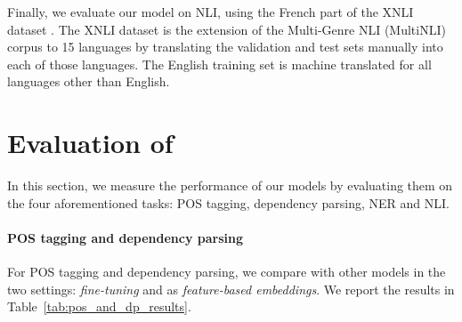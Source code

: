 Finally, we evaluate our model on NLI, using the French part of the XNLI dataset \cite{conneau-etal-2018-xnli}. The XNLI dataset is the extension of the Multi-Genre NLI (MultiNLI) corpus \cite{williams-etal-2018-broad} to 15 languages by translating the validation and test sets manually into each of those languages. The English training set is machine translated for all languages other than English.

\section{Evaluation of \camembert}

In this section, we measure the performance of our models by evaluating them on the four aforementioned tasks: POS tagging, dependency parsing, NER and NLI.

\paragraph{POS tagging and dependency parsing}
For POS tagging and dependency parsing, we compare \camembert with other models in the two settings: \textit{fine-tuning} and as \textit{feature-based embeddings}. We report the results in Table~\ref{tab:pos_and_dp_results}.

